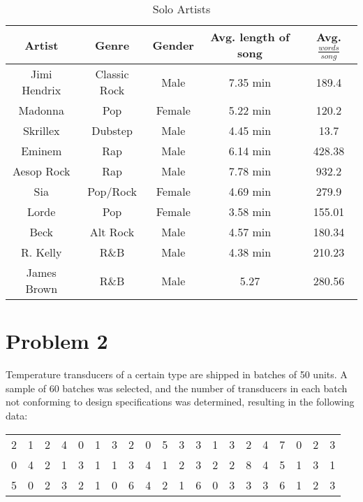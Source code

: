 \documentclass{article}
\begin{document}
	\begin{table}[!htb]
	\begin{tabular}{ | c || c | c | c | c | } \hline
		Artist & Genre & Gender & Avg. length of song & Avg. $\frac{words}{song}$ \\ \hline \hline
		Jimi Hendrix & Classic Rock & Male & 7.35 min & 189.4 \\ \hline %
		Madonna & Pop & Female & 5.22 min & 120.2 \\ \hline %
		Skrillex & Dubstep & Male & 4.45 min & 13.7 \\ \hline %
		Eminem & Rap & Male & 6.14 min & 428.38 \\ \hline %
		Aesop Rock & Rap & Male & 7.78 min & 932.2 \\ \hline %
		Sia & Pop/Rock & Female & 4.69 min & 279.9 \\ \hline %
		Lorde & Pop & Female & 3.58 min & 155.01 \\ \hline %
		Beck & Alt Rock & Male & 4.57 min & 180.34 \\ \hline %
		R. Kelly & R\&B & Male & 4.38 min & 210.23 \\ \hline %
		James Brown & R\&B & Male & 5.27 & 280.56 \\ \hline %
	\end{tabular}
	\caption{Solo Artists}
	\label{tab:solo_artists}
	\end{table}

\clearpage
\section*{Problem 2}

	Temperature transducers of a certain type are shipped in batches of 50 units. A sample of 60
	batches was selected, and the number of transducers in each batch not conforming to design
	specifications was determined, resulting in the following data:
	
	\vspace{-1.0\baselineskip}
	\begin{table}[!htb]
	\begin{tabular}{ c c c c c c c c c c c c c c c c c c c c }
		2 & 1 & 2 & 4 & 0 & 1 & 3 & 2 & 0 & 5 & 3 & 3 & 1 & 3 & 2 & 4 & 7 & 0 & 2 & 3 \\
		0 & 4 & 2 & 1 & 3 & 1 & 1 & 3 & 4 & 1 & 2 & 3 & 2 & 2 & 8 & 4 & 5 & 1 & 3 & 1 \\
		5 & 0 & 2 & 3 & 2 & 1 & 0 & 6 & 4 & 2 & 1 & 6 & 0 & 3 & 3 & 3 & 6 & 1 & 2 & 3 \\
	\end{tabular}
	\end{table}
	\vspace{-1.0\baselineskip}
	
\end{document}
